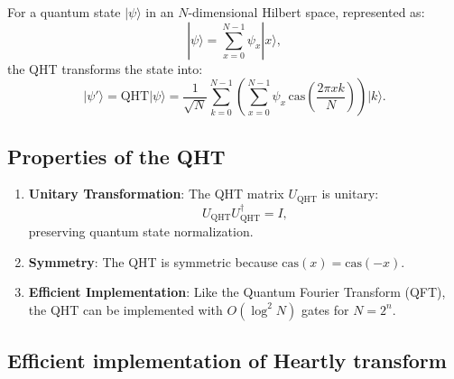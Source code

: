 \documentclass[11pt]{article}
\theoremstyle{definition}
\newcommand{\qht}{\mathsf{QHT}}
\newcommand{\qft}{\mathsf{QFT}}
\begin{document}
For a quantum state \( |\psi\rangle \) in an \( N \)-dimensional Hilbert space, represented as:
\[
|\psi\rangle = \sum_{x=0}^{N-1} \psi_x |x\rangle,
\]
the QHT transforms the state into:
\[
|\psi'\rangle = \text{QHT} |\psi\rangle = \frac{1}{\sqrt{N}} \sum_{k=0}^{N-1} \left( \sum_{x=0}^{N-1} \psi_x \, \text{cas}\left(\frac{2\pi x k}{N}\right) \right) |k\rangle.
\]


\subsection*{Properties of the QHT}
\begin{enumerate}
    \item \textbf{Unitary Transformation}: The QHT matrix \( U_{\text{QHT}} \) is unitary:
    \[
    U_{\text{QHT}} U_{\text{QHT}}^\dagger = I,
    \]
    preserving quantum state normalization.
    \item \textbf{Symmetry}: The QHT is symmetric because \( \text{cas}(x) = \text{cas}(-x) \).
    \item \textbf{Efficient Implementation}: Like the Quantum Fourier Transform (QFT), the QHT can be implemented with \( O(\log^2 N) \) gates for \( N = 2^n \).
\end{enumerate}


\subsection*{Efficient implementation of Heartly transform}

\end{document}
